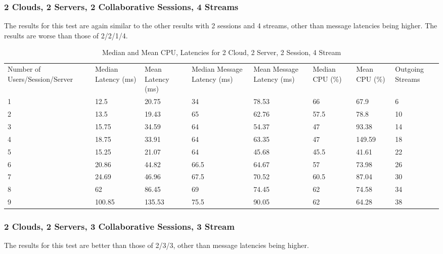 \subsubsection{2 Clouds, 2 Servers, 2 Collaborative Sessions, 4 Streams}

The results for this test are again similar to the other results with 2 sessions and 4 streams, other than message latencies being higher. The results are worse than those of 2/2/1/4.

\begin{table}
\caption{Median and Mean CPU, Latencies for 2 Cloud, 2 Server, 2 Session, 4 Stream}
\label{table:2cld_2serv_2sess_4str}
\begin{tabu} to\linewidth{|X[c]|X[c]|X[c]|X[c]|X[c]|X[c]|X[c]|X[c]|}
\everyrow{\hline}
\hline
Number of Users/Session/Server & Median Latency (ms) & Mean Latency (ms) & Median Message Latency (ms) & Mean Message Latency (ms) & Median CPU (\%) & Mean CPU (\%) & Outgoing Streams\\
1 & 12.5 & 20.75 & 34 & 78.53 & 66 & 67.9 & 6 \\
2 & 13.5 & 19.43 & 65 & 62.76 & 57.5 & 78.8 & 10 \\
3 & 15.75 & 34.59 & 64 & 54.37 & 47 & 93.38 & 14 \\
4 & 18.75 & 33.91 & 64 & 63.35 & 47 & 149.59 & 18 \\
5 & 15.25 & 21.07 & 64 & 45.68 & 45.5 & 41.61 & 22 \\
6 & 20.86 & 44.82 & 66.5 & 64.67 & 57 & 73.98 & 26 \\
7 & 24.69 & 46.96 & 67.5 & 70.52 & 60.5 & 87.04 & 30 \\
8 & 62 & 86.45 & 69 & 74.45 & 62 & 74.58 & 34 \\
9 & 100.85 & 135.53 & 75.5 & 90.05 & 62 & 64.28 & 38 \\
\end{tabu}
\end{table}

\subsubsection{2 Clouds, 2 Servers, 3 Collaborative Sessions, 3 Stream}

The results for this test are better than those of 2/3/3, other than message latencies being higher.

